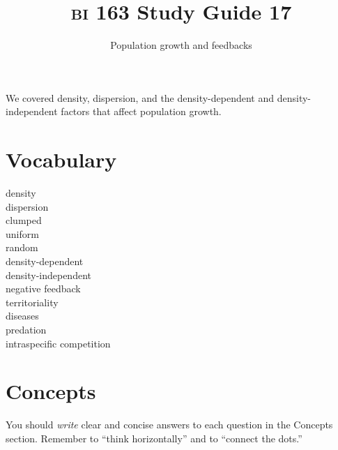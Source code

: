 \documentclass[letterpaper]{tufte-handout}
\title{{\scshape bi} 163 Study Guide 17}
\author{Population growth and feedbacks}
\date{} %
\begin{document}
\maketitle	%

We covered density, dispersion, and the density-dependent and density-independent factors that affect population growth.

\section*{Vocabulary}

\vspace{-1\baselineskip}
\begin{multicols}{2}
density \\
dispersion \\
clumped \\
uniform \\
random \\
density-dependent\\
density-independent\\
negative feedback\\
territoriality\\
diseases\\
predation\\
intraspecific competition
\end{multicols}

\section*{Concepts}

You should \emph{write} clear and concise answers to each question in the Concepts section.  Remember to ``think horizontally'' and to ``connect the dots.'' 
\end{document}
